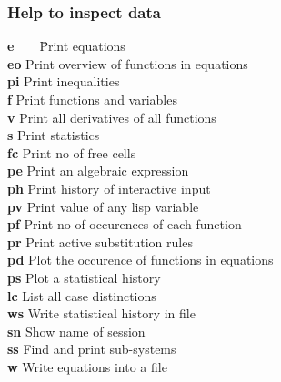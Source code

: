 \documentclass[12pt]{article}
\begin{document}
\subsubsection{Help to inspect data} 
\begin{tabbing}
  {\bf e}\ \ \ \ \= Print equations          \\
  {\bf eo}   \> Print overview of functions in equations  \\
  {\bf pi}   \> Print inequalities  \\ 
  {\bf f}    \> Print functions and variables        \\
  {\bf v}    \> Print all derivatives of all functions  \\
  {\bf s}    \> Print statistics                  \\
  {\bf fc}   \> Print no of free cells  \\
  {\bf pe}   \> Print an algebraic expression \\
  {\bf ph}   \> Print history of interactive input \\
  {\bf pv}   \> Print value of any lisp variable \\
  {\bf pf}   \> Print no of occurences of each function \\
  {\bf pr}   \> Print active substitution rules \\
  {\bf pd}   \> Plot the occurence of functions in equations \\
  {\bf ps}   \> Plot a statistical history \\
  {\bf lc}   \> List all case distinctions \\
  {\bf ws}   \> Write statistical history in file \\
  {\bf sn}   \> Show name of session \\
  {\bf ss}   \> Find and print sub-systems \\
  {\bf w}    \> Write equations into a file
\end{tabbing}
\end{document}
